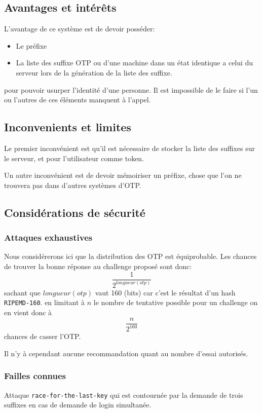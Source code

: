 \documentclass{../res/univ-projet}
\begin{document}
\subsection{Avantages et intér\^ets}
L'avantage de ce système est de devoir posséder:
\begin{itemize}
    \item Le préfixe
    \item La liste des suffixe OTP ou d'une machine dans un état
        identique a celui du serveur lors de la génération de la liste des
        suffixe.
\end{itemize} 
pour pouvoir usurper l'identité d'une personne.
Il est impossible de le faire si l'un ou l'autres de ces éléments
manquent à l'appel.

\subsection{Inconvenients et limites}
Le premier inconvénient est qu'il est nécessaire de stocker la liste
des suffixes sur le serveur, et pour l'utilisateur comme token.

Un autre inconvénient est de devoir mémoiriser un préfixe, chose que
l'on ne trouvera pas dans d'autres systèmes d'OTP. 

\subsection{Considérations de sécurité}
\subsubsection{Attaques exhaustives}
Nous considérerons ici que la distribution des OTP est équiprobable.
Les chances de trouver la bonne réponse au challenge proposé sont donc:
        \[\frac{1}{2^{longueur(otp)}}\]
sachant que $longueur(otp)$ vaut 160 (bits) car c'est le r\'esultat d'un hash
\verb?RIPEMD-160?.
en limitant à $n$ le nombre de tentative possible pour un challenge
on en vient donc à \[\frac{n}{2^{160}}\] chances
de casser l'OTP.

Il n'y à cependant aucune recommandation quant au nombre d'essai 
autoris\'es.

\subsubsection{Failles connues}
Attaque \verb?race-for-the-last-key? qui est contourn\'ee par
la demande de trois suffixes en cas de demande de login simultan\'ee.
\end{document}
